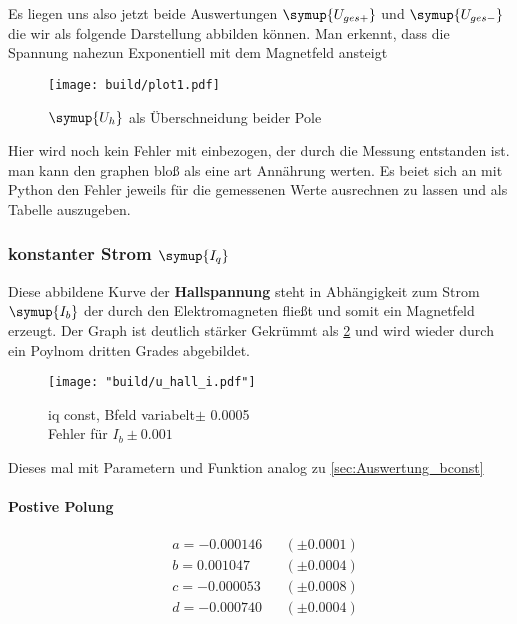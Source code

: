 Es liegen uns also jetzt beide Auswertungen $\symup{U_{ges+}}$ und $\symup{U_{ges-}}$ die wir als folgende Darstellung abbilden können.
Man erkennt, dass die Spannung nahezun Exponentiell mit dem Magnetfeld ansteigt %

\begin{figure}[h]
   \centering
   \texttt{[image: build/plot1.pdf]} %
   \caption{$\symup{U_h}$ als Überschneidung beider Pole}
   \label{fig:auswertunghall}
\end{figure}

Hier wird noch kein Fehler mit einbezogen, der durch die Messung entstanden ist. man kann den graphen bloß als eine art Annährung werten. 
Es beiet sich an mit Python den Fehler jeweils für die gemessenen Werte ausrechnen zu lassen und als Tabelle auszugeben.


\subsubsection{konstanter Strom $\symup{I_q}$}
\label{sec:Auswertung_iconst}

Diese abbildene Kurve der \textbf{Hallspannung} steht in Abhängigkeit zum Strom $\symup{I_b}$ der durch den Elektromagneten fließt und somit ein Magnetfeld erzeugt.
Der Graph ist deutlich stärker Gekrümmt als \ref{fig:Uhall} und wird wieder durch ein Poylnom dritten Grades abgebildet. 


\begin{figure}
   \centering
    \texttt{[image: "build/u\_hall\_i.pdf"]}
    \caption{iq const, Bfeld variabelt$\pm$ 0.0005\\Fehler für $I_b \pm 0.001$}
    \label{fig:Uhall}
 \end{figure}



Dieses mal mit Parametern und Funktion analog zu \ref{sec:Auswertung_bconst}
\paragraph{Postive Polung}

\begin{align*}
&a = -0.000146 &&(\pm  0.0001) \\
&b = 0.001047 &&(\pm  0.0004 ) \\
&c = -0.000053 &&(\pm  0.0008) \\
&d = -0.000740 &&(\pm  0.0004) 
\end{align*}

